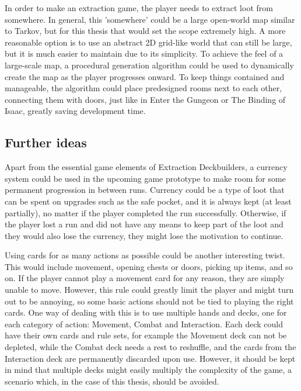 In order to make an extraction game, the player needs to extract loot from somewhere. In general, this 'somewhere' could be a large open-world map similar to Tarkov\cite{escapeFromTarkov2017}, but for this thesis that would set the scope extremely high. A more reasonable option is to use an abstract 2D grid-like world that can still be large, but it is much easier to maintain due to its simplicity. To achieve the feel of a large-scale map, a procedural generation algorithm\cite{van2013procedural} could be used to dynamically create the map as the player progresses onward. To keep things contained and manageable, the algorithm could place predesigned rooms next to each other, connecting them with doors, just like in Enter the Gungeon\cite{enterTheGungeon2016} or The Binding of Isaac\cite{theBindingOfIsaacRebirth2014}, greatly saving development time.



\subsection{Further ideas}

Apart from the essential game elements of Extraction Deckbuilders, a currency system could be used in the upcoming game prototype to make room for some permanent progression in between runs. Currency could be a type of loot that can be spent on upgrades such as the safe pocket, and it is always kept (at least partially), no matter if the player completed the run successfully. Otherwise, if the player lost a run and did not have any means to keep part of the loot and they would also lose the currency, they might lose the motivation to continue.

Using cards for as many actions as possible could be another interesting twist. This would include movement, opening chests or doors, picking up items, and so on. If the player cannot play a movement card for any reason, they are simply unable to move. However, this rule could greatly limit the player and might turn out to be annoying, so some basic actions should not be tied to playing the right cards. One way of dealing with this is to use multiple hands and decks, one for each category of action: Movement, Combat and Interaction. Each deck could have their own cards and rule sets, for example the Movement deck can not be depleted, while the Combat deck needs a rest to reshuffle, and the cards from the Interaction deck are permanently discarded upon use. However, it should be kept in mind that multiple decks might easily multiply the complexity of the game, a scenario which, in the case of this thesis, should be avoided.

